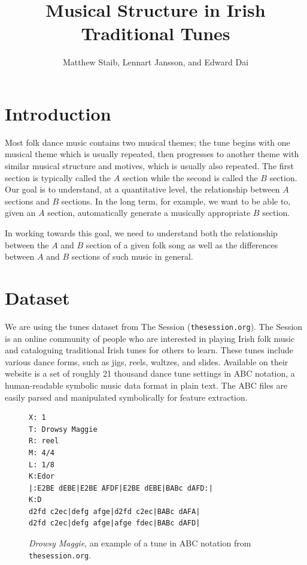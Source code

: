 \documentclass{article} %
\title{Musical Structure in Irish Traditional Tunes}
\author{Matthew Staib, Lennart Jansson, and Edward Dai}
\begin{document}
\maketitle

\section{Introduction}
Most folk dance music contains two musical themes; the tune begins with one
musical theme which is usually repeated, then progresses to another theme with
similar musical structure and motives, which is usually also repeated. The first
section is typically called the $A$ section while the second is called the $B$
section. Our goal is to understand, at a quantitative level, the relationship
between $A$ sections and $B$ sections. In the long term, for example, we want to
be able to, given an $A$ section, automatically generate a musically appropriate
$B$ section.

In working towards this goal, we need to understand both the relationship
between the $A$ and $B$ section of a given folk song as well as the differences
between $A$ and $B$ sections of such music in general. 

\section{Dataset}

We are using the tunes dataset from The Session (\texttt{thesession.org}). The
Session is an online community of people who are interested in playing Irish
folk music and cataloguing traditional Irish tunes for others to learn. These
tunes include various dance forms, such as jigs, reels, waltzes, and slides.
Available on their website is a set of roughly 21 thousand dance tune settings
in ABC notation, a human-readable symbolic music data format in plain text. The
ABC files are easily parsed and manipulated symbolically for feature extraction.
\FloatBarrier
\begin{figure}[t]
  \begin{center}
  \begin{BVerbatim}
X: 1
T: Drowsy Maggie
R: reel
M: 4/4
L: 1/8
K:Edor
|:E2BE dEBE|E2BE AFDF|E2BE dEBE|BABc dAFD:|
K:D
d2fd c2ec|defg afge|d2fd c2ec|BABc dAFA|
d2fd c2ec|defg afge|afge fdec|BABc dAFD|
  \end{BVerbatim}
  \end{center}
  \caption{\textit{Drowsy Maggie}, an example of a tune in ABC notation from
  \texttt{thesession.org}.}
\end{figure}
\end{document}
